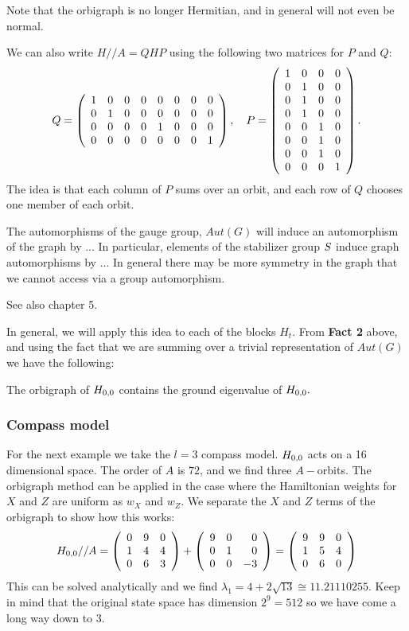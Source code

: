 \documentclass[12pt]{article}
\renewenvironment{framed}[1][\hsize]{%
\def\FrameCommand{{\color{black}\vrule width 3pt}\hspace{0pt}\fboxsep=\FrameSep\colorbox{lightgray}}%
\MakeFramed{\hsize0.8\linewidth\advance\hsize-\width\FrameRestore}}
{\endMakeFramed}
\begin{document}
Note that the orbigraph is no longer Hermitian,
and in general will not even be normal.

We can also write $H//A = QHP$ using the following two matrices for $P$ and $Q:$
$$
Q = 
\left(\begin{array}{rrrrrrrr}
 1 &  0 &  0 &  0 &  0 &  0 &  0 &  0 \cr
  0 &  1 &  0 &  0 &  0 &  0 &  0 &  0 \cr
  0 &  0 &  0 &  0 &  1 &  0 &  0 &  0 \cr
  0 &  0 &  0 &  0 &  0 &  0 &  0 &  1
\end{array}\right),\ \ \ 
P = 
\left(\begin{array}{rrrr}
 1 &  0 &  0 &  0 \cr
  0 &  1 &  0 &  0 \cr
  0 &  1 &  0 &  0 \cr
  0 &  1 &  0 &  0 \cr
  0 &  0 &  1 &  0 \cr
  0 &  0 &  1 &  0 \cr
  0 &  0 &  1 &  0 \cr
  0 &  0 &  0 &  1
\end{array}\right).
$$
The idea is that each column of $P$ sums over an orbit,
and each row of $Q$ chooses one member of each orbit.

The automorphisms of the gauge group, $Aut(G)$ will induce an
automorphism of the graph by ...
In particular, elements of the stabilizer group $S$ induce graph 
automorphisms by ...
In general there may be more symmetry in the graph that
we cannot access via a group automorphism.

See also \cite{Cvetkovic1980} chapter 5.

In general, we will apply this idea to each of the blocks $H_t$.
From {\bf Fact 2} above, and using the fact that we are
summing over a trivial representation of $Aut(G)$ we have the following:
\begin{framed}

The orbigraph of $H_{0,0}$ contains the ground eigenvalue of $H_{0,0}.$
\end{framed}

%
\subsubsection{Compass model}
For the next example we take the $l=3$ compass model.
$H_{0,0}$ acts on a 16 dimensional space.
The order of $A$ is $72$, and we find three $A-$orbits.
The orbigraph method can be applied in the case
where the Hamiltonian weights for $X$ and $Z$ are uniform as $w_X$ and $w_Z.$
We separate the $X$ and $Z$ terms of the orbigraph to show
how this works:
$$
H_{0,0}//A = 
\left(\begin{array}{rrr}
 0 &  9 &  0 \cr
  1 &  4 &  4 \cr
  0 &  6 &  3
\end{array}\right) + 
\left(\begin{array}{rrr}
 9 &  0 &  0 \cr
  0 &  1 &  0 \cr
  0 &  0 &  -3
\end{array}\right)
=
\left(\begin{array}{rrr}
 9 &  9 &  0 \cr
  1 &  5 &  4 \cr
  0 &  6 &  0
\end{array}\right)
$$
This can be solved analytically and we find $\lambda_1 = 4+2\sqrt{13} \cong 11.21110255.$
Keep in mind that the original state space has dimension $2^9=512$ so we
have come a long way down to 3.
\end{document}
